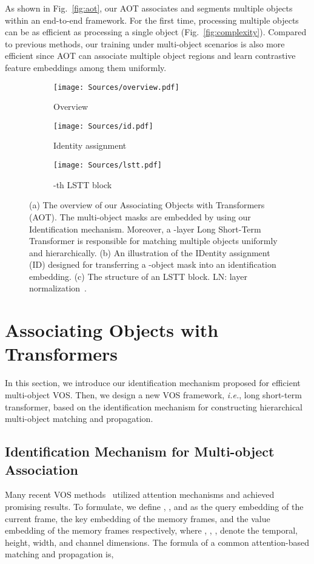 \documentclass{article}
\def\ie{\emph{i.e.}}
\begin{document}
As shown in Fig.~\ref{fig:aot}, our AOT associates and segments multiple objects within an end-to-end framework. For the first time, processing multiple objects can be as efficient as processing a single object (Fig.~\ref{fig:complexity}). Compared to previous methods, our training under multi-object scenarios is also more efficient since AOT can associate multiple object regions and learn contrastive feature embeddings among them uniformly. 
\begin{figure}[t!]
\begin{center}

\begin{subfigure}[b]{.393\textwidth}
			\centering
			\texttt{[image: Sources/overview.pdf]}
			\caption{Overview}\label{fig:overview}
\end{subfigure}
\begin{subfigure}[b]{.292\textwidth}
			\centering
			\texttt{[image: Sources/id.pdf]}

			\caption{Identity assignment}\label{fig:id}
\end{subfigure}
\begin{subfigure}[b]{.292\textwidth}
			\centering
			\texttt{[image: Sources/lstt.pdf]}
			\caption{-th LSTT block}\label{fig:lstt}
\end{subfigure}

\end{center}

\caption{(a) The overview of our Associating Objects with Transformers (AOT). The multi-object masks are embedded by using our Identification mechanism. Moreover, a -layer Long Short-Term Transformer is responsible for matching multiple objects uniformly and hierarchically. (b) An illustration of the IDentity assignment (ID) designed for transferring a -object mask into an identification embedding. (c) The structure of an LSTT block. LN: layer normalization~\cite{ln}.}
\end{figure} 
\section{Associating Objects with Transformers}
In this section, we introduce our identification mechanism proposed for efficient multi-object VOS. Then, we design a new VOS framework, \ie, long short-term transformer, based on the identification mechanism for constructing hierarchical multi-object matching and propagation.


\subsection{Identification Mechanism for Multi-object Association}
Many recent VOS methods~\cite{spacetime,EGMN,KMN} utilized attention mechanisms and achieved promising results.
To formulate, we define , , and  as the query embedding of the current frame, the key embedding of the memory frames, and the value embedding of the memory frames respectively, where , , ,  denote the temporal, height, width, and channel dimensions. The formula of a common attention-based matching and propagation is,
\end{document}
